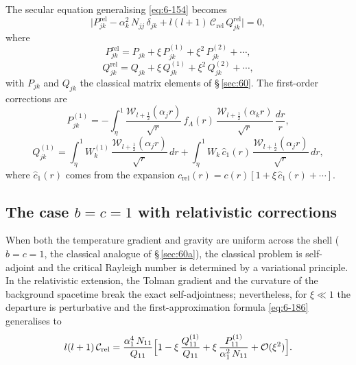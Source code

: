 The secular equation generalising \eqref{eq:6-154} becomes
\begin{equation}\label{eq:rel-60-22}
\bigl|P_{jk}^{\mathrm{rel}}
  - \alpha_{k}^{2}\,N_{jj}\,\delta_{jk}
  + l(l+1)\,\mathcal{C}_{\mathrm{rel}}\,Q_{jk}^{\mathrm{rel}}\bigr| = 0,
\end{equation}
where
\begin{equation}\label{eq:rel-60-23}
P_{jk}^{\mathrm{rel}} = P_{jk}
  + \xi\,P_{jk}^{(1)} + \xi^{2}\,P_{jk}^{(2)}+\cdots,
\end{equation}
\begin{equation}\label{eq:rel-60-24}
Q_{jk}^{\mathrm{rel}} = Q_{jk}
  + \xi\,Q_{jk}^{(1)} + \xi^{2}\,Q_{jk}^{(2)}+\cdots,
\end{equation}
with $P_{jk}$ and $Q_{jk}$ the classical matrix elements of
\S\,\ref{sec:60}.  The first-order corrections are
\begin{equation}\label{eq:rel-60-25}
P_{jk}^{(1)} = -\int_{\eta}^{1}\frac{\mathscr{W}_{l+\frac{1}{2}}(\alpha_{j}r)}{\sqrt{r}}\,
  f_{\Lambda}(r)\,
  \frac{\mathscr{W}_{l+\frac{1}{2}}(\alpha_{k}r)}{\sqrt{r}}\,\frac{dr}{r},
\end{equation}
\begin{equation}\label{eq:rel-60-26}
Q_{jk}^{(1)} = \int_{\eta}^{1} W_{k}^{(1)}\,
  \frac{\mathscr{W}_{l+\frac{1}{2}}(\alpha_{j}r)}{\sqrt{r}}\,dr
  + \int_{\eta}^{1} W_{k}\,\hat{c}_{1}(r)\,
  \frac{\mathscr{W}_{l+\frac{1}{2}}(\alpha_{j}r)}{\sqrt{r}}\,dr,
\end{equation}
where $\hat{c}_{1}(r)$ comes from the expansion
$c_{\mathrm{rel}}(r) = c(r)[1+\xi\,\hat{c}_{1}(r)+\cdots]$.

\subsection{The case $b = c = 1$ with relativistic corrections}
\label{sec:rel-60a}

When both the temperature gradient and gravity are uniform across the
shell ($b=c=1$, the classical analogue of \S\,\ref{sec:60a}), the
classical problem is self-adjoint and the critical Rayleigh number is
determined by a variational principle.  In the relativistic extension,
the Tolman gradient and the curvature of the background spacetime
break the exact self-adjointness; nevertheless, for $\xi\ll 1$ the
departure is perturbative and the first-approximation formula
\eqref{eq:6-186} generalises to
\begin{equation}\label{eq:rel-60-27}
l(l+1)\,\mathcal{C}_{\mathrm{rel}}
  = \frac{\alpha_{1}^{4}\,N_{11}}{Q_{11}}
  \Bigl[1 - \xi\,\frac{Q_{11}^{(1)}}{Q_{11}}
  + \xi\,\frac{P_{11}^{(1)}}{\alpha_{1}^{2}\,N_{11}}
  + \mathcal{O}(\xi^{2})\Bigr].
\end{equation}

